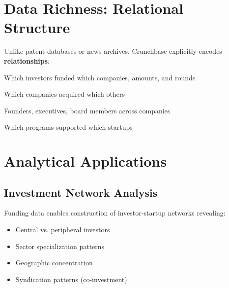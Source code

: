 \section*{Data Richness: Relational Structure}

Unlike patent databases or news archives, Crunchbase explicitly encodes \textbf{relationships}:

\begin{description}[leftmargin=0.5cm, itemsep=0.3em]
\item[Funding Relationships] Which investors funded which companies, amounts, and rounds
\item[Acquisition Relationships] Which companies acquired which others
\item[People Relationships] Founders, executives, board members across companies
\item[Accelerator Relationships] Which programs supported which startups
\end{description}



\section*{Analytical Applications}

\subsection*{Investment Network Analysis}

Funding data enables construction of investor-startup networks revealing:
\begin{itemize}[leftmargin=*, itemsep=0.2em]
\item Central vs. peripheral investors
\item Sector specialization patterns
\item Geographic concentration
\item Syndication patterns (co-investment)
\end{itemize}

